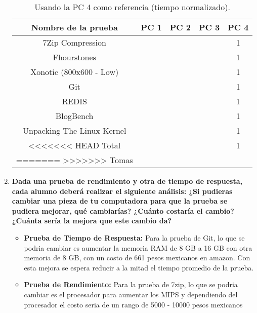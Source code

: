 \documentclass[12pt]{article}
\newcommand{\pl}[1]{\item \textbf{ #1 }}
\begin{document}
\begin{enumerate}[label=(\arabic{section}.\arabic{subsection}.\arabic{enumi})]
    \begin{table}[htb]
        \centering
        \begin{tabular}{|c|c|c|c|c|}
        \hline
        \textbf{Nombre de la prueba} & \textbf{PC 1} & \textbf{PC 2} & \textbf{PC 3} & \textbf{PC 4}\\
        \hline
        7Zip Compression & & & & 1 \\
        \hline
        Fhourstones & & & & 1 \\
        \hline
        Xonotic (800x600 - Low) & & & & 1 \\
        \hline
        Git & & & & 1 \\
        \hline
        REDIS & & & & 1 \\
        \hline
        BlogBench & & & & 1 \\
        \hline
        Unpacking The Linux Kernel & & & & 1  \\
<<<<<<< HEAD
        \hline
        Total & & & & 1\\
=======
>>>>>>> Tomas
        \hline
        \end{tabular}
        \caption{Usando la PC 4 como referencia (tiempo normalizado).}
    \end{table}

    \pl{Dada una prueba de rendimiento y otra de tiempo de respuesta, cada alumno deberá realizar el siguiente análisis: ¿Si pudieras cambiar una pieza de tu computadora para que la prueba se pudiera mejorar, qué cambiarías? ¿Cuánto costaría el cambio? ¿Cuánta sería la mejora que este cambio da?}
    
    \begin{itemize}
        \item \textbf{Prueba de Tiempo de Respuesta:} 
        Para la prueba de Git, lo que se podria cambiar es aumentar la memoria RAM de 8 GB a 16 GB con otra memoria de 8 GB, con un costo de 661 pesos mexicanos en amazon.  Con esta mejora se espera reducir a la mitad el tiempo promedio de la prueba.
        \item \textbf{Prueba de Rendimiento:}
        Para la prueba de 7zip, lo que se podria cambiar es el procesador para aumentar los MIPS y dependiendo del procesador el costo seria de un rango de 5000 - 10000 pesos mexicanos
    \end{itemize}
\end{enumerate}

\newpage
\end{document}
